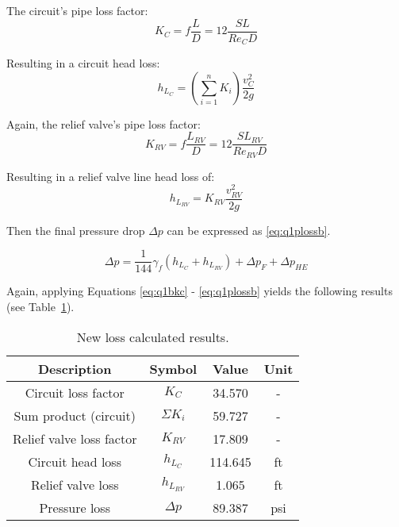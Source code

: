 The circuit's pipe loss factor:
\begin{equation}
	\label{eq:q1bkc}	
	K_{C} = f \frac{L}{D} = 12 \frac{SL}{Re_{C} D}
\end{equation}

Resulting in a circuit head loss:
\begin{equation}
	\label{eq:q1bhlc}	
	h_{L_{C}} = \left( \sum_{i=1}^{n} K_i \right) \frac{v_{C}^2}{2g} 
\end{equation}

Again, the relief valve's pipe loss factor:
\begin{equation}
	\label{eq:q1bkrv}	
	K_{RV} = f \frac{L_{RV}}{D} = 12 \frac{SL_{RV}}{Re_{RV} D} 
\end{equation}

Resulting in a relief valve line head loss of:
\begin{equation}
	\label{eq:q1hlrv}	
	h_{L_{RV}} = K_{RV} \frac{v_{RV}^2}{2g} 
\end{equation}


Then the final pressure drop $ \Delta p$ can be expressed as \ref{eq:q1plossb}.

\begin{equation}
	\label{eq:q1plossb}	
	\Delta p = \frac{1}{144}\gamma_f \left( h_{L_C} + h_{L_{RV}} \right) + \Delta p_F + \Delta p_{HE} 
\end{equation}

Again, applying Equations \ref{eq:q1bkc} - \ref{eq:q1plossb} yields the following results (see Table~\ref{tab:q1plossb}).

\begin{table}[H]
  \centering
  \caption{New loss calculated results.}
    \begin{tabular}{cccc}
    \toprule
    \textbf{Description} & \textbf{Symbol} & \textbf{Value } & \textbf{Unit} \\
    \midrule
    Circuit loss factor & $K_{C}$ &34.570 & - \\
    Sum product (circuit) & $\Sigma K_i$   &  59.727& - \\
    Relief valve loss factor & $K_{RV}$   & 17.809& - \\
    Circuit head loss & $h_{L_{C}}$ &  114.645 & ft \\
    Relief valve loss & $h_{L_{RV}}$ &  1.065 & ft \\
    Pressure loss & $\Delta p$ & 89.387 & psi \\
    \bottomrule
    \end{tabular}
  \label{tab:q1plossb}
\end{table}

